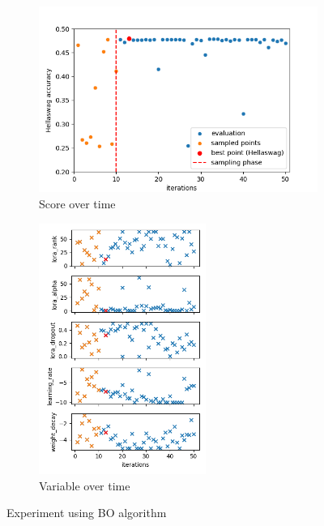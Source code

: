 \documentclass[runningheads]{llncs}
\begin{document}
\begin{figure}[h!]
    \centering
    \begin{subfigure}[b]{.50\textwidth}
      \centering
      \includegraphics[width = \textwidth]{figures/bo/score_evolution.png}
      \caption{Score over time}
      \label{fig:bo_score_time}
    \end{subfigure}%
    \begin{subfigure}[b]{.40\textwidth}
      \centering
      \includegraphics[width = 0.6\textwidth]{figures/bo/variables_evolution.png}
      \caption{Variable over time}
      \label{fig:bo_var_time}
    \end{subfigure}
    \caption{Experiment using BO algorithm}
    \label{fig:bo_res}
\end{figure}
\end{document}
